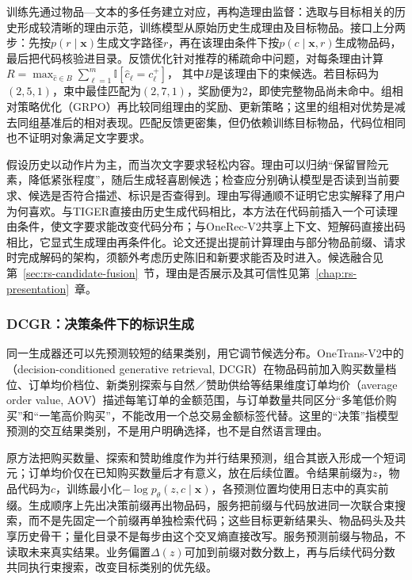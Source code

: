 训练先通过物品—文本的多任务建立对应，再构造理由监督：选取与目标相关的历史形成较清晰的理由示范，训练模型从原始历史生成理由及目标物品。接口上分两步：先按$p(r\mid\bm x)$生成文字路径$r$，再在该理由条件下按$p(c\mid\bm x,r)$生成物品码，最后把代码核验进目录。反馈优化针对推荐的稀疏命中问题，对每条理由计算
$R=\max_{\hat c\in B}\sum_{\ell=1}^m\mathbb I[\hat c_\ell=c_\ell^+]$，
其中$B$是该理由下的束候选。若目标码为$(2,5,1)$，束中最佳匹配为$(2,7,1)$，奖励便为2，即使完整物品尚未命中。组相对策略优化（GRPO）再比较同组理由的奖励、更新策略；这里的组相对优势是减去同组基准后的相对表现。匹配反馈更密集，但仍依赖训练目标物品，代码位相同也不证明对象满足文字要求。

假设历史以动作片为主，而当次文字要求轻松内容。理由可以归纳“保留冒险元素，降低紧张程度”，随后生成轻喜剧候选；检查应分别确认模型是否读到当前要求、候选是否符合描述、标识是否查得到。理由写得通顺不证明它忠实解释了用户为何喜欢。与TIGER直接由历史生成代码相比，本方法在代码前插入一个可读理由条件，使文字要求能改变代码分布；与OneRec-V2共享上下文、短解码直接出码相比，它显式生成理由再条件化。论文还提出提前计算理由与部分物品前缀、请求时完成解码的架构，须额外考虑历史陈旧和新要求能否及时进入。候选融合见第~\ref{sec:rs-candidate-fusion}~节，理由是否展示及其可信性见第~\ref{chap:rs-presentation}~章。

\subsubsection{DCGR：决策条件下的标识生成}
\label{sec:rs-dcgr}

同一生成器还可以先预测较短的结果类别，用它调节候选分布。OneTrans-V2中的（decision-conditioned generative retrieval, DCGR）在物品码前加入购买数量档位、订单均价档位、新类别探索与自然／赞助供给等结果维度订单均价（average order value, AOV）描述每笔订单的金额范围，与订单数量共同区分“多笔低价购买”和“一笔高价购买”，不能改用一个总交易金额标签代替。这里的“决策”指模型预测的交互结果类别，不是用户明确选择，也不是自然语言理由。

原方法把购买数量、探索和赞助维度作为并行结果预测，组合其嵌入形成一个短词元；订单均价仅在已知购买数量后才有意义，放在后续位置。令结果前缀为$z$，物品代码为$c$，训练最小化$-\log p_\theta(z,c\mid\bm x)$，各预测位置均使用日志中的真实前缀。生成顺序上先出决策前缀再出物品码，服务把前缀与代码放进同一次联合束搜索，而不是先固定一个前缀再单独检索代码；这些目标更新结果头、物品码头及共享历史骨干；量化目录不是每步由这个交叉熵直接改写。服务预测前缀与物品，不读取未来真实结果。业务偏置$\Delta(z)$可加到前缀对数分数上，再与后续代码分数共同执行束搜索，改变目标类别的优先级。

